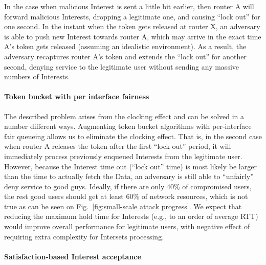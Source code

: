 In the case when malicious Interest is sent a little bit earlier, then router A will forward malicious Interests, dropping a legitimate one, and causing ``lock out'' for one second.
In the instant when the token gets released at router X, an adversary is able to push new Interest towards router A, which may arrive in the exact time A's token gets released (assuming an idealistic environment).
As a result, the adversary recaptures router A's token and extends the ``lock out'' for another second, denying service to the legitimate user without sending any massive numbers of Interests.

\paragraph{\textbf{Token bucket with per interface fairness}}

The described problem arises from the clocking effect and can be solved in a number different ways.
Augmenting token bucket algorithms with per-interface fair queueing allows us to eliminate the clocking effect. 
That is, in the second case when router A releases the token after the first ``lock out'' period, it will immediately process previously enqueued Interests from the legitimate user.
However, because the Interest time out (``lock out'' time) is most likely be larger than the time to actually fetch the Data, an adversary is still able to ``unfairly'' deny service to good guys.
Ideally, if there are only 40\% of compromised users, the rest good users should get at least 60\% of network resources, which is not true as can be seen on Fig.~\ref{fig:small-scale attack progress}.
We expect that reducing the maximum hold time for Interests (e.g., to an order of average RTT) would improve overall performance for legitimate users, with negative effect of requiring extra complexity for Intersets processing.

\paragraph{\textbf{Satisfaction-based Interest acceptance}}

